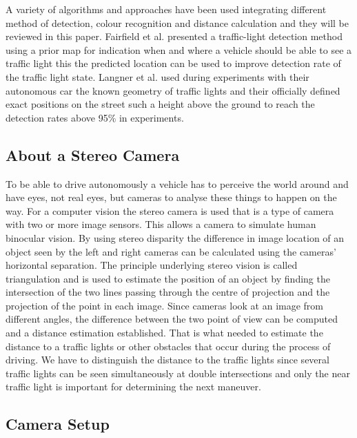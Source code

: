\documentclass[letterpaper, 10 pt, conference]{ieeeconf} %
\begin{document}
A variety of algorithms and approaches have been used integrating different method of detection, colour recognition and distance calculation and they will be reviewed in this paper. Fairfield et al. \cite{c5} presented a traffic-light detection method using a prior map for indication when and where a vehicle should be able to see a traffic light this the predicted location can be used to improve detection rate of the traffic light state. Langner et al. \cite{c4} used during experiments with their autonomous car the known geometry of traffic lights and their officially defined exact positions on the street such a height above the ground to reach the detection rates above 95\% in experiments.

\subsection{About a Stereo Camera}
To be able to drive autonomously a vehicle has to perceive the world around and have eyes, not real eyes, but cameras to analyse these things to happen on the way. For a computer vision the stereo camera is used that is a type of camera with two or more image sensors. This allows a camera to simulate human binocular vision. By using stereo disparity the difference in image location of an object seen by the left and right cameras can be calculated using the cameras' horizontal separation. The principle underlying stereo vision is called triangulation and is used to estimate the position of an object by finding the intersection of the two lines passing through the centre of projection and the projection of the point in each image. Since cameras look at an image from different angles, the difference between the two point of view can be computed and a distance estimation established. That is what needed to estimate the distance to a traffic lights or other obstacles that occur during the process of driving. We have to distinguish the distance to the traffic lights since several traffic lights can be seen simultaneously at double intersections and only the near traffic light is important for determining the next maneuver. 

\subsection{Camera Setup}
\end{document}
